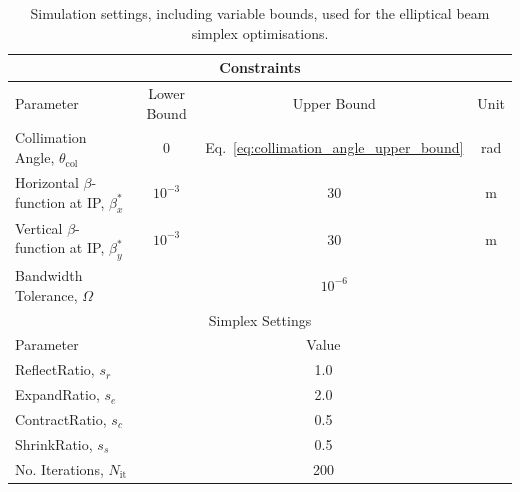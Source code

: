 \documentclass[../main.tex]{subfiles}
\begin{document}
\begin{table}[!h]
\centering
\caption{Simulation settings, including variable bounds, used for the elliptical beam simplex optimisations.}
\vspace{3mm}
\begin{tabular}{lccc}
\hline\hline
\multicolumn{4}{c}{Constraints} \\
\hline
Parameter & Lower Bound & Upper Bound & Unit \\ 
\hline
Collimation Angle, $\theta_{\mathrm{col}}$ & 0 & Eq.~\ref{eq:collimation_angle_upper_bound} & \si{\radian} \\
Horizontal $\beta$-function at IP, $\beta_{x}^{*}$ & $10^{-3}$ & 30 & \si{\meter} \\
Vertical $\beta$-function at IP, $\beta_{y}^{*}$ & $10^{-3}$ & 30 & \si{\meter} \\
Bandwidth Tolerance, $\Omega$ & & $10^{-6}$ & \\
\hline
\multicolumn{4}{c}{Simplex Settings} \\
\hline
Parameter & \multicolumn{3}{c}{Value} \\
\hline
ReflectRatio, $s_{r}$ & \multicolumn{3}{c}{1.0} \\
ExpandRatio, $s_{e}$ & \multicolumn{3}{c}{2.0} \\
ContractRatio, $s_{c}$ & \multicolumn{3}{c}{0.5} \\
ShrinkRatio, $s_{s}$ & \multicolumn{3}{c}{0.5} \\
No. Iterations, $N_{\mathrm{it}}$ & \multicolumn{3}{c}{200} \\
\hline\hline
\end{tabular}
\label{tab:simplex_optimisation_settings}
\end{table}
\end{document}
